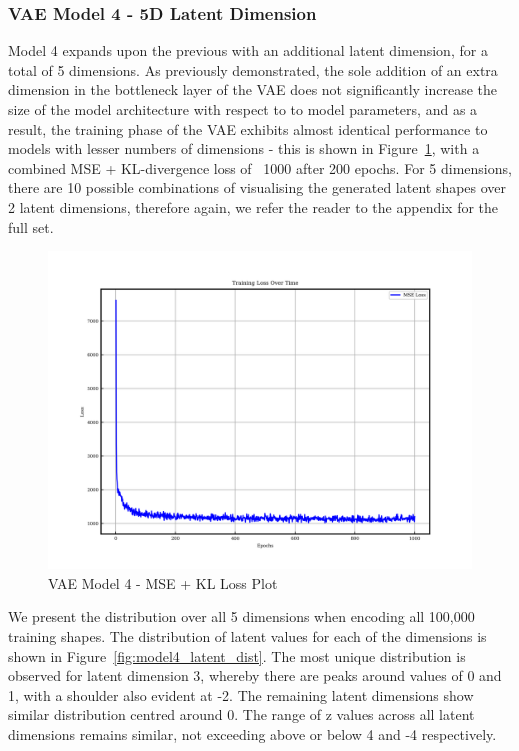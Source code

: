 \documentclass{article}
\begin{document}
\subsubsection{VAE Model 4 - 5D Latent Dimension}

Model 4 expands upon the previous with an additional latent dimension, for a total of 5 dimensions. As previously demonstrated, the sole addition of an extra dimension in the bottleneck layer of the VAE does not significantly increase the size of the model architecture with respect to to model parameters, and as a result, the training phase of the VAE exhibits almost identical performance to models with lesser numbers of dimensions - this is shown in Figure~\ref{fig:model4_loss_plot}, with a combined MSE + KL-divergence loss of ~1000 after 200 epochs. For 5 dimensions, there are 10 possible combinations of visualising the generated latent shapes over 2 latent dimensions, therefore again, we refer the reader to the appendix for the full set.

\begin{figure}[H]
\centering
    \includegraphics[width=0.75\linewidth]{figures/VAEmodels/model4/loss_plot.png}
    \caption{VAE Model 4 - MSE + KL Loss Plot}
    \label{fig:model4_loss_plot}
\end{figure}

We present the distribution over all 5 dimensions when encoding all 100,000 training shapes. The distribution of latent values for each of the dimensions is shown in Figure~\ref{fig:model4_latent_dist}. The most unique distribution is observed for latent dimension 3, whereby there are peaks around values of 0 and 1, with a shoulder also evident at -2. The remaining latent dimensions show similar distribution centred around 0. The range of z values across all latent dimensions remains similar, not exceeding above or below 4 and -4 respectively.
\end{document}
